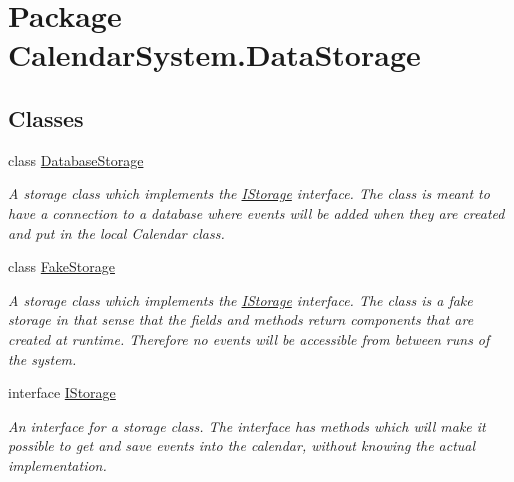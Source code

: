 \hypertarget{namespace_calendar_system_1_1_data_storage}{\section{Package Calendar\+System.\+Data\+Storage}
\label{namespace_calendar_system_1_1_data_storage}
}
\subsection*{Classes}
\begin{DoxyCompactItemize}
\item 
class \hyperlink{class_calendar_system_1_1_data_storage_1_1_database_storage}{Database\+Storage}
\begin{DoxyCompactList}\small\item\em A storage class which implements the \hyperlink{interface_calendar_system_1_1_data_storage_1_1_i_storage}{I\+Storage} interface. The class is meant to have a connection to a database where events will be added when they are created and put in the local Calendar class. \end{DoxyCompactList}\item 
class \hyperlink{class_calendar_system_1_1_data_storage_1_1_fake_storage}{Fake\+Storage}
\begin{DoxyCompactList}\small\item\em A storage class which implements the \hyperlink{interface_calendar_system_1_1_data_storage_1_1_i_storage}{I\+Storage} interface. The class is a fake storage in that sense that the fields and methods return components that are created at runtime. Therefore no events will be accessible from between runs of the system. \end{DoxyCompactList}\item 
interface \hyperlink{interface_calendar_system_1_1_data_storage_1_1_i_storage}{I\+Storage}
\begin{DoxyCompactList}\small\item\em An interface for a storage class. The interface has methods which will make it possible to get and save events into the calendar, without knowing the actual implementation. \end{DoxyCompactList}\end{DoxyCompactItemize}
